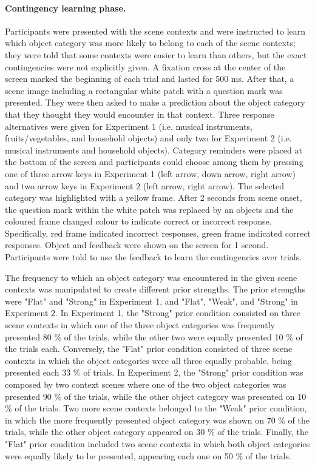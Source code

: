 \documentclass[a4paper,12pt]{article}
\begin{document}
\paragraph{Contingency learning phase.}
Participants were presented with the scene contexts and were instructed to learn which object category was more likely to belong to each of the scene contexts; they were told that some contexts were easier to learn than others, but the exact contingencies were not explicitly given. A fixation cross at the center of the screen marked the beginning of each trial and lasted for 500 ms. After that, a scene image including a rectangular white patch with a question mark was presented. They were then asked to make a prediction about the object category that they thought they would encounter in that context. Three response alternatives were given for Experiment 1 (i.e. musical instruments, fruits/vegetables, and household objects) and only two for Experiment 2 (i.e. musical instruments and household objects). Category reminders were placed at the bottom of the screen and participants could choose among them by pressing one of three arrow keys in Experiment 1 (left arrow, down arrow, right arrow) and two arrow keys in Experiment 2 (left arrow, right arrow). The selected category was highlighted with a yellow frame. After 2 seconds from scene onset, the question mark within the white patch was replaced by an objects and the coloured frame changed colour to indicate correct or incorrect response. Specifically, red frame indicated incorrect responses, green frame indicated correct responses. Object and feedback were shown on the screen for 1 second. Participants were told to use the feedback to learn the contingencies over trials. \par
The frequency to which an object category was encountered in the given scene contexts was manipulated to create different prior strengths. The prior strengths were "Flat" and "Strong" in Experiment 1, and "Flat", "Weak", and "Strong" in Experiment 2. In Experiment 1, the "Strong" prior condition consisted on three scene contexts in which one of the three object categories was frequently presented 80 \% of the trials, while the other two were equally presented 10 \% of the trials each. Conversely, the "Flat" prior condition consisted of three scene contexts in which the object categories were all three equally probable, being presented each 33 \% of trials. 
In Experiment 2, the "Strong" prior condition was composed by two context scenes where one of the two object categories was presented 90 \% of the trials, while the other object category was presented on 10 \% of the trials. Two more scene contexts belonged to the "Weak" prior condition, in which the more frequently presented object category was shown on 70 \% of the trials, while the other object category appeared on 30 \% of the trials. Finally, the "Flat" prior condition included two scene contexts in which both object categories were equally likely to be presented, appearing each one on 50 \% of the trials. 
\end{document}
